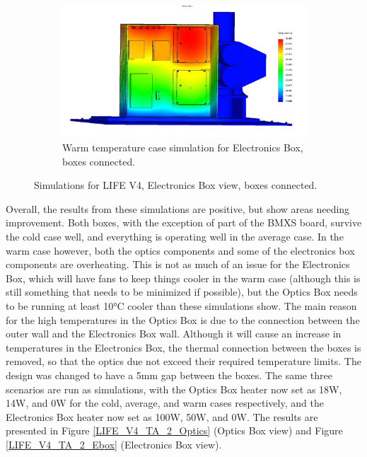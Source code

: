 \begin{figure}
    \begin{subfigure}[h]{0.65\textwidth}
        \centering
        \includegraphics[width=\textwidth]{chap3_images/LIFE_V4_images/TA_Full_Model_Iter_3_ebox.JPG}
        \caption{Warm temperature case simulation for Electronics Box, boxes connected.}
        \label{fig:LIFE_V4_TA_Ebox_1c}
    \end{subfigure}
    \caption{Simulations for LIFE V4, Electronics Box view, boxes connected.}
    \label{LIFE_V4_TA_1_Ebox}
\end{figure}

Overall, the results from these simulations are positive, but show areas needing improvement. Both boxes, with the exception of part of the BMXS board, survive the cold case well, and everything is operating well in the average case. In the warm case however, both the optics components and some of the electronics box components are overheating. This is not as much of an issue for the Electronics Box, which will have fans to keep things cooler in the warm case (although this is still something that needs to be minimized if possible), but the Optics Box needs to be running at least 10°C cooler than these simulations show. The main reason for the high temperatures in the Optics Box is due to the connection between the outer wall and the Electronics Box wall. Although it will cause an increase in temperatures in the Electronics Box, the thermal connection between the boxes is removed, so that the optics due not exceed their required temperature limits. The design was changed to have a 5mm gap between the boxes. The same three scenarios are run as simulations, with the Optics Box heater now set as 18W, 14W, and 0W for the cold, average, and warm cases respectively, and the Electronics Box heater now set as 100W, 50W, and 0W. The results are presented in Figure \ref{LIFE_V4_TA_2_Optics} (Optics Box view) and Figure \ref{LIFE_V4_TA_2_Ebox} (Electronics Box view).

